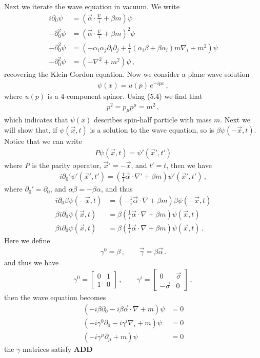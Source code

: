\documentclass[11pt, onesided]{book}
\theoremstyle{break}
\theoremstyle{break}
\newcommand{\pd}{\partial}
\newcommand{\bmat}[1]{\begin{bmatrix} #1 \end{bmatrix}}
\begin{document}
Next we iterate the wave equation in vacuum. We write
\begin{align*}
i \pd_0 \psi &= \left( \vec{\alpha}\cdot \frac{\nabla}{i}+\beta m\right) \psi\\
- \pd_0^2 \psi &= \left( \vec{\alpha}\cdot \frac{\nabla}{i}+\beta m\right)^2 \psi\\
- \pd_0^2 \psi &= \left(-\alpha_i \alpha_j \pd_i \pd_j + \frac{1}{i}\left( \alpha_i \beta + \beta \alpha_i \right) m \nabla_i + m^2 \right) \psi\\
- \pd_0^2 \psi&= \left(-\nabla^2 + m^2\right) \psi\,, \tag{5.4}
\end{align*}
\setcounter{equation}{4}
recovering the Klein-Gordon equation. Now we consider a plane wave solution
\begin{align*}
\psi(x) =u(p)\, e^{-ipx}\,,
\end{align*}
where $u(p)$ is a $4$-component spinor. Using (5.4) we find that
\begin{align*}
p^2 = p_\mu p^\mu = m^2\,,
\end{align*}
which indicates that $\psi(x)$ describes spin-half particle with mass $m$. Next we will show that, if $\psi(\vec{x},t)$ is a solution to the wave equation, so is $\beta \psi(-\vec{x},t)$. Notice that we can write
\begin{align*}
P\psi(\vec{x},t) = \psi'(\vec{x}', t')
\end{align*} 
where $P$ is the parity operator, $\vec{x}' =- \vec{x}$, and $t' = t$, then we have
\begin{align*}
i\pd_0'\psi'(\vec{x}', t') = \left( \frac{1}{i}\vec{\alpha}\cdot \nabla' + \beta m\right) \psi'(\vec{x}', t')\,,
\end{align*}
where $\pd_0' = \pd_0$, and $\alpha\beta = -\beta \alpha$, and thus
\begin{align*}
i\pd_0 \beta\psi(-\vec{x}, t) &= \left(-\frac{1}{i}\vec{\alpha}\cdot \nabla + \beta m\right) \beta\psi(-\vec{x}, t)\\
\beta i\pd_0 \psi(\vec{x}, t) &= \beta\left(\frac{1}{i}\vec{\alpha}\cdot \nabla + \beta m\right) \psi(\vec{x}, t)\\
\beta i\pd_0 \psi(\vec{x}, t) &= \beta\left(\frac{1}{i}\vec{\alpha}\cdot \nabla + \beta m\right) \psi(\vec{x}, t)\,.
\end{align*}
Here we define
\begin{align*}
\gamma^0 = \beta\,,\qquad
\vec{\gamma} = \beta \vec{\alpha}\,.
\end{align*}
and thus we have
\begin{align*}
\gamma^0 = \bmat{0 & 1 \\ 1 &0}\,,\qquad
\gamma^i = \bmat{0 & \vec{\sigma} \\ -\vec{\sigma} & 0}\,,
\end{align*}
then the wave equation becomes
\begin{align*}
(-i\beta \pd_0 - i\beta \vec{\alpha}\cdot \nabla + m) \psi &= 0\\
(-i \gamma^0 \pd_0 - i\gamma^i \nabla_i + m)\psi &= 0\\
(-i \gamma^\mu \pd_\mu + m)\psi &=0
\end{align*}
the $\gamma$ matrices satisfy \textbf{ADD}\\
\end{document}
